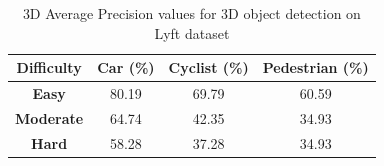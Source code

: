 \documentclass[10pt,twocolumn,letterpaper]{article}
\begin{document}
\begin{table}[!htbp]
    \caption[3D AP calculated for 2D proposals generated from 3D Annotations]{3D Average Precision values for 3D object detection on Lyft dataset \label{3DAP Values-1} \cite{Lyft2019}}
    \centering
    \begin{tabular}{|c|c|c|c|}
        \hline \textbf{Difficulty} & \textbf{Car (\%)} & \textbf{Cyclist (\%)} & \textbf{Pedestrian (\%)}  \\
        \hline \textbf{Easy} & 80.19  & 69.79  & 60.59 \\
        \hline \textbf{Moderate} & 64.74  & 42.35 & 34.93 \\
        \hline \textbf{Hard} & 58.28  & 37.28  & 34.93  \\
        \hline
    \end{tabular}
    \end{table}
\end{document}
